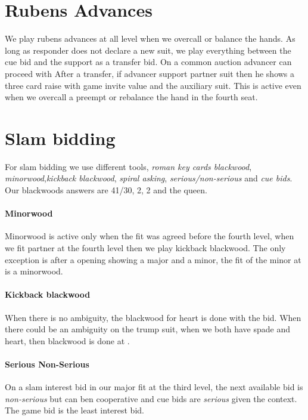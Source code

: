 \section{Rubens Advances}
We play rubens advances at all level when we overcall or balance the hands. As long as responder does not declare a new suit, we play everything between the cue bid and the support as a transfer bid. On a common auction
advancer can proceed with 
After a transfer, if advancer support partner suit then he shows a three card raise with game invite value and the auxiliary suit. This is active even when we overcall a preempt or rebalance the hand in the fourth seat.
\section{Slam bidding}
For slam bidding we use different tools, \emph{roman key cards blackwood}, \emph{minorwood},\emph{kickback blackwood}, \emph{spiral asking}, \emph{serious/non-serious} and \emph{cue bids}. Our blackwoods answers are 41/30, 2, 2 and the queen.
\paragraph{Minorwood} Minorwood is active only when the fit was agreed before the fourth level, when we fit partner at the fourth level then we play kickback blackwood. The only exception is after a  opening showing a major and a minor, the fit of the minor at  is a minorwood.
\paragraph{Kickback blackwood} When there is no ambiguity, the blackwood for heart is done with the \bid{4\SpS} bid. When there could be an ambiguity on the trump suit, when we both have spade and heart, then blackwood is done at \bid{4\NT}.
\paragraph{Serious Non-Serious} On a slam interest bid in our major fit at the third level, the next available bid is \emph{non-serious} but can ben cooperative and cue bids are \emph{serious} given the context. The game bid is the least interest bid.
